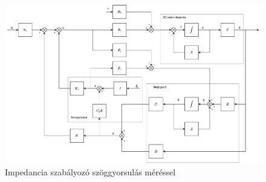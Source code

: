 \begin{figure}[ht]
\begin{center}
\includegraphics[width=\textwidth]{images/compensated_position_controller_angular_acceleration.pdf}
\caption{Impedancia szabályozó szöggyorsulás méréssel}
\end{center}
\end{figure}


